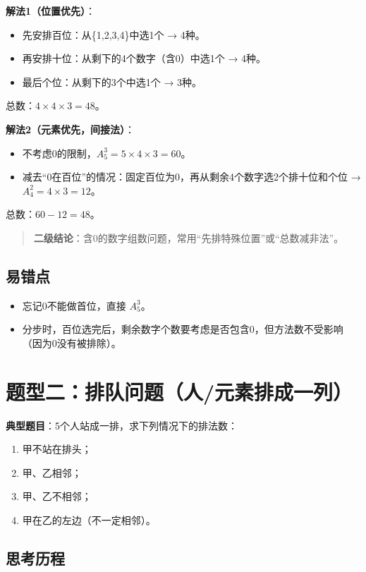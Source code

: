 \documentclass[10pt]{article}
\begin{document}
\textbf{解法1（位置优先）}：
\begin{itemize}
\item 先安排百位：从\{1,2,3,4\}中选1个 → 4种。
\item 再安排十位：从剩下的4个数字（含0）中选1个 → 4种。
\item 最后个位：从剩下的3个中选1个 → 3种。
\end{itemize}
总数：\(4 \times 4 \times 3 = 48\)。

\textbf{解法2（元素优先，间接法）}：
\begin{itemize}
\item 不考虑0的限制，\(A_5^3 = 5\times4\times3=60\)。
\item 减去“0在百位”的情况：固定百位为0，再从剩余4个数字选2个排十位和个位 → \(A_4^2 = 4\times3=12\)。
\end{itemize}
总数：\(60-12=48\)。

\begin{quote}
\textbf{二级结论}：含0的数字组数问题，常用“先排特殊位置”或“总数减非法”。
\end{quote}

\subsection*{易错点}
\begin{itemize}
\item 忘记0不能做首位，直接 \(A_5^3\)。
\item 分步时，百位选完后，剩余数字个数要考虑是否包含0，但方法数不受影响（因为0没有被排除）。
\end{itemize}

\section{题型二：排队问题（人/元素排成一列）}

\textbf{典型题目}：5个人站成一排，求下列情况下的排法数：
\begin{enumerate}
\item 甲不站在排头；
\item 甲、乙相邻；
\item 甲、乙不相邻；
\item 甲在乙的左边（不一定相邻）。
\end{enumerate}

\subsection*{思考历程}
\end{document}
